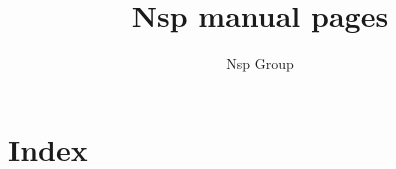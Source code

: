 \documentclass[11pt]{book}
\title{Nsp manual pages}
\author{Nsp Group}
\begin{document}
\maketitle

\tableofcontents 






\chapter{Index}
\printindex
\end{document}
